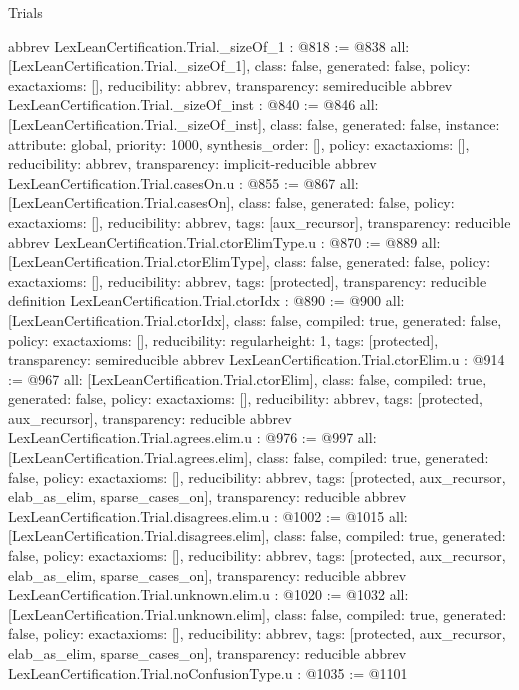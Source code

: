 \begin{lexlean}{Trials}
\begin{coremodule}
{}
abbrev LexLeanCertification.Trial._sizeOf_1 : @818 := @838 {
  all: [LexLeanCertification.Trial._sizeOf_1],
  class: false,
  generated: false,
  policy: exact{axioms: []},
  reducibility: abbrev{},
  transparency: semireducible
}
abbrev LexLeanCertification.Trial._sizeOf_inst : @840 := @846 {
  all: [LexLeanCertification.Trial._sizeOf_inst],
  class: false,
  generated: false,
  instance: {attribute: global, priority: 1000, synthesis_order: []},
  policy: exact{axioms: []},
  reducibility: abbrev{},
  transparency: implicit-reducible
}
abbrev LexLeanCertification.Trial.casesOn.{u} : @855 := @867 {
  all: [LexLeanCertification.Trial.casesOn],
  class: false,
  generated: false,
  policy: exact{axioms: []},
  reducibility: abbrev{},
  tags: [aux_recursor],
  transparency: reducible
}
abbrev LexLeanCertification.Trial.ctorElimType.{u} : @870 := @889 {
  all: [LexLeanCertification.Trial.ctorElimType],
  class: false,
  generated: false,
  policy: exact{axioms: []},
  reducibility: abbrev{},
  tags: [protected],
  transparency: reducible
}
definition LexLeanCertification.Trial.ctorIdx : @890 := @900 {
  all: [LexLeanCertification.Trial.ctorIdx],
  class: false,
  compiled: true,
  generated: false,
  policy: exact{axioms: []},
  reducibility: regular{height: 1},
  tags: [protected],
  transparency: semireducible
}
abbrev LexLeanCertification.Trial.ctorElim.{u} : @914 := @967 {
  all: [LexLeanCertification.Trial.ctorElim],
  class: false,
  compiled: true,
  generated: false,
  policy: exact{axioms: []},
  reducibility: abbrev{},
  tags: [protected, aux_recursor],
  transparency: reducible
}
abbrev LexLeanCertification.Trial.agrees.elim.{u} : @976 := @997 {
  all: [LexLeanCertification.Trial.agrees.elim],
  class: false,
  compiled: true,
  generated: false,
  policy: exact{axioms: []},
  reducibility: abbrev{},
  tags: [protected, aux_recursor, elab_as_elim, sparse_cases_on],
  transparency: reducible
}
abbrev LexLeanCertification.Trial.disagrees.elim.{u} : @1002 := @1015 {
  all: [LexLeanCertification.Trial.disagrees.elim],
  class: false,
  compiled: true,
  generated: false,
  policy: exact{axioms: []},
  reducibility: abbrev{},
  tags: [protected, aux_recursor, elab_as_elim, sparse_cases_on],
  transparency: reducible
}
abbrev LexLeanCertification.Trial.unknown.elim.{u} : @1020 := @1032 {
  all: [LexLeanCertification.Trial.unknown.elim],
  class: false,
  compiled: true,
  generated: false,
  policy: exact{axioms: []},
  reducibility: abbrev{},
  tags: [protected, aux_recursor, elab_as_elim, sparse_cases_on],
  transparency: reducible
}
abbrev LexLeanCertification.Trial.noConfusionType.{u} : @1035 := @1101 {
}
\end{coremodule}
\end{lexlean}
